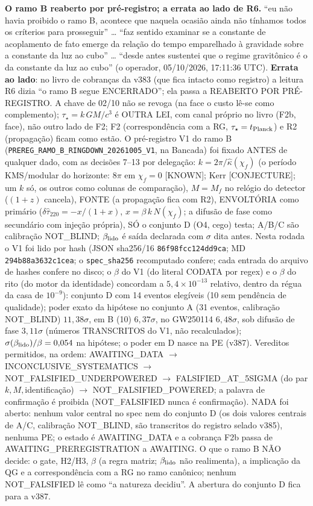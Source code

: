 \documentclass[11pt]{article}
\theoremstyle{definition}\newtheorem{deriv}{Derivação}
\begin{document}
\textbf{O ramo B reaberto por pré-registro; a errata ao lado de R6.} ``eu não havia proibido o ramo B, acontece que naquela ocasião ainda não tínhamos todos os críterios para prosseguir'' … ``faz sentido examinar se a constante de acoplamento de fato emerge da relação do tempo emparelhado à gravidade sobre a constante da luz ao cubo'' … ``desde antes sustentei que o regime gravitônico é o da constante da luz ao cubo'' (o operador, 05/10/2026, 17:11:36 UTC). \textbf{Errata ao lado}: no livro de cobranças da v383 (que fica intacto como registro) a leitura R6 dizia ``o ramo B segue ENCERRADO''; ela passa a REABERTO POR PRÉ-REGISTRO. A chave de 02/10 não se revoga (na face o custo lê-se como complemento); $\tau_\star=k\,GM/c^3$ é OUTRA LEI, com canal próprio no livro (F2b, face), não outro lado de F2; F2 (correspondência com a RG, $\tau_\star=t_{\rm Planck}$) e R2 (propagação) ficam como estão. O pré-registro V1 do ramo B (\texttt{PREREG\_RAMO\_B\_RINGDOWN\_20261005\_V1}, na Bancada) foi fixado ANTES de qualquer dado, com as decisões 7--13 por delegação: $k=2\pi/\hat\kappa(\chi_f)$ (o período KMS/modular do horizonte: $8\pi$ em $\chi_f=0$ \textsf{[KNOWN]}; Kerr \textsf{[CONJECTURE]}; um $k$ só, os outros como colunas de comparação), $M=M_f$ no relógio do detector ($(1+z)$ cancela), FONTE (a propagação fica com R2), ENVOLTÓRIA como primário ($\delta\hat\tau_{220}=-x/(1+x)$, $x=\beta\,k\,N(\chi_f)$; a difusão de fase como secundário com injeção própria), SÓ o conjunto D (O4, cego) testa; A/B/C são calibração NOT\_BLIND; $\beta_{\rm lido}$ é saída declarada com $\sigma$ dita antes. Nesta rodada o V1 foi lido por hash (JSON sha256/16 \texttt{86f98fcc124dd9ca}; MD \texttt{294b88a3632c1cea}; o \texttt{spec\_sha256} recomputado confere; cada entrada do arquivo de hashes confere no disco; o $\beta$ do V1 (do literal CODATA por regex) e o $\beta$ do rito (do motor da identidade) concordam a $5{,}4\times10^{-13}$ relativo, dentro da régua da casa de $10^{-9}$): conjunto D com 14 eventos elegíveis (10 sem pendência de qualidade); poder exato da hipótese no conjunto A (31 eventos, calibração NOT\_BLIND) $11{,}38\sigma$, em B (10) $6{,}37\sigma$, no GW250114 $6{,}48\sigma$, sob difusão de fase $3{,}11\sigma$ (números TRANSCRITOS do V1, não recalculados); $\sigma(\beta_{\rm lido})/\beta=0{,}054$ na hipótese; o poder em D nasce na PE (v387). Vereditos permitidos, na ordem: AWAITING\_DATA $\to$ INCONCLUSIVE\_SYSTEMATICS $\to$ NOT\_FALSIFIED\_UNDERPOWERED $\to$ FALSIFIED\_AT\_5SIGMA (do par $k,M,$identificação) $\to$ NOT\_FALSIFIED\_POWERED; a palavra de confirmação é proibida (NOT\_FALSIFIED nunca é confirmação). NADA foi aberto: nenhum valor central no spec nem do conjunto D (os dois valores centrais de A/C, calibração NOT\_BLIND, são transcritos do registro selado v385), nenhuma PE; o estado é AWAITING\_DATA e a cobrança F2b passa de AWAITING\_PREREGISTRATION a AWAITING. O que o ramo B NÃO decide: o gate, H2/H3, $\beta$ (a regra matriz; $\beta_{\rm lido}$ não realimenta), a implicação da QG e a correspondência com a RG no ramo canônico; nenhum NOT\_FALSIFIED lê como ``a natureza decidiu''. A abertura do conjunto D fica para a v387.
\end{document}
